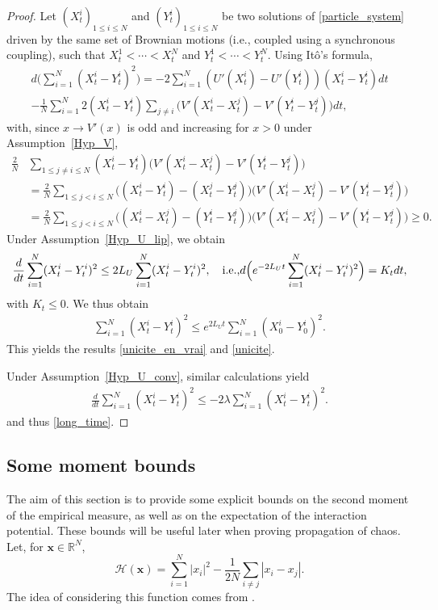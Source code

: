\documentclass[11pt]{article}
\newcommand{\ie}{i.e.,\xspace}
\newcommand{\bx}{{\boldsymbol{x}}}
\theoremstyle{plain}
\theoremstyle{definition}
\begin{document}
\begin{proof}

Let $(X^i_t)_{1\leq i\leq N}$ and $(Y^i_t)_{1\leq i\leq N}$ be two solutions of \eqref{particle_system} driven by the same set of Brownian motions (\ie coupled using a synchronous coupling), such that \hbox{$X^1_t<\cdots<X^N_t$} and $Y^1_t<\cdots<Y^N_t$. Using Itô's formula,
\begin{multline*}
d\biggl(\sum_{i=1}^N(X^i_t-Y^i_t)^2\biggr)=-2\sum_{i=1}^N\left(U'(X^i_t)-U'(Y^i_t)\right)(X^i_t-Y^i_t)dt\\[-5pt]
-\frac{1}{N}\sum_{i=1}^N2(X^i_t-Y^i_t)\sum_{j\neq i}\bigl(V'(X^i_t-X^j_t)-V'(Y^i_t-Y^j_t)\bigr)dt,
\end{multline*}
with, since $x\to V'(x)$ is odd and increasing for $x>0$ under Assumption~\ref{Hyp_V},
\begin{align*}
\frac{2}{N}&\sum_{1\leq j\neq i\leq N}(X^i_t-Y^i_t)\bigl(V'(X^i_t-X^j_t)-V'(Y^i_t-Y^j_t)\bigr)\\
&=\frac{2}{N}\sum_{1\leq j<i\leq N}\bigl((X^i_t-Y^i_t)-(X^j_t-Y^j_t)\bigr)\bigl(V'(X^i_t-X^j_t)-V'(Y^i_t-Y^j_t)\bigr)\\
&=\frac{2}{N}\sum_{1\leq j<i\leq N}\bigl((X^i_t-X^j_t)-(Y^i_t-Y^j_t)\bigr)\bigl(V'(X^i_t-X^j_t)-V'(Y^i_t-Y^j_t)\bigr)\geq0.
\end{align*}
Under Assumption~\ref{Hyp_U_lip}, we obtain
\[
\frac{d}{dt}\sum_{i=1}^N(X^i_t-Y^i_t)^2\leq 2L_U\sum_{i=1}^N (X^i_t-Y^i_t)^2,
\quad\text{\ie}
d \Bigl(e^{-2L_U t}\sum_{i=1}^N(X^i_t-Y^i_t)^2\Bigr)=K_tdt,
\]
with $K_t\leq0$. We thus obtain
\begin{align*}
\sum_{i=1}^N(X^i_t-Y^i_t)^2\leq e^{2L_U t}\sum_{i=1}^N(X^i_0-Y^i_0)^2.
\end{align*}
This yields the results \eqref{unicite_en_vrai} and \eqref{unicite}.

Under Assumption~\ref{Hyp_U_conv}, similar calculations yield
\begin{align*}
\frac{d}{dt}\sum_{i=1}^N(X^i_t-Y^i_t)^2\leq-2\lambda\sum_{i=1}^N (X^i_t-Y^i_t)^2.
\end{align*}
and thus \eqref{long_time}.
\end{proof}

\subsection{Some moment bounds}\label{sec_bornes}

The aim of this section is to provide some explicit bounds on the second moment of the empirical measure, as well as on the expectation of the interaction potential. These bounds will be useful later when proving propagation of chaos. Let, for $\bx\in\mathbb{R}^N$,
\begin{equation}\label{def_H_cal}
\mathcal{H}(\bx)=\sum_{i=1}^N\left|x_i\right|^2-\frac{1}{2N}\sum_{i\neq j}|x_i-x_j|.
\end{equation}
The idea of considering this function comes from \cite{lu_mattingly}.
\end{document}
